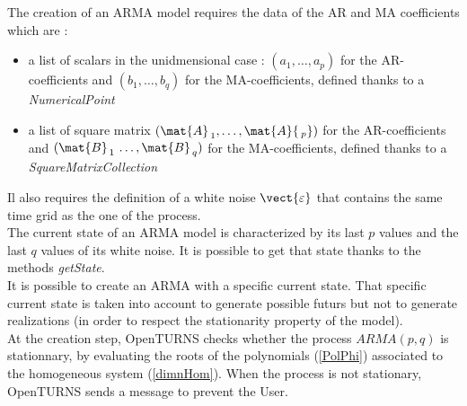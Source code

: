 \renewcommand{\filename}{docUC_StocProc_ARMA_Creation.tex}
\renewcommand{\filetitle}{UC : Creation of an ARMA process}

\HeaderIIILevel

\label{ARMACreation}






The creation of an ARMA model requires the data of the AR and MA coefficients which are :
\begin{itemize}
\item a list of scalars in the unidmensional case : $(a_1, \hdots, a_p)$ for the AR-coefficients and  $(b_1, \hdots, b_q)$ for the MA-coefficients, defined thanks to a \emph{NumericalPoint}
\item a list of square matrix $( \mat{A}_{\, 1}, \hdots, \mat{A}{\, _p})$ for the AR-coefficients and  $(\mat{B}_{\, 1}\, \hdots, \mat{B}_{\, q} )$ for the MA-coefficients, defined thanks to a \emph{SquareMatrixCollection}
\end{itemize}
Il also requires the definition of a white noise $ \vect{\varepsilon}$ that contains the same time grid as the one of the process.\\

The current state of an ARMA model is characterized by its last $p$ values and the last $q$ values of its white noise. It is possible to get that state thanks to the methods \emph{getState}. \\



It is possible to create an ARMA with a specific current state. That specific current state is  taken into account to  generate possible futurs but not to generate realizations (in order to respect the stationarity property of the model).\\

At the creation step, OpenTURNS checks whether the process $ARMA(p,q)$ is stationnary, by evaluating the roots of the polynomials (\ref{PolPhi})  associated to the homogeneous system (\ref{dimnHom}). When the process is not stationary, OpenTURNS sends a message to prevent the User.\\




